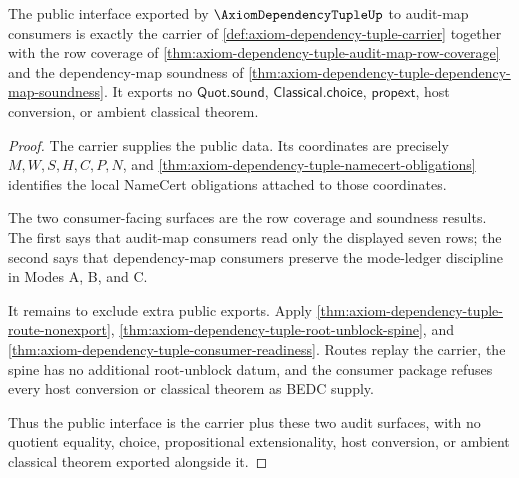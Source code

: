 \begin{theorem}
\label{thm:axiom-dependency-tuple-public-interface-exactness}
The public interface exported by $\AxiomDependencyTupleUp$ to audit-map
consumers is exactly the carrier of
\autoref{def:axiom-dependency-tuple-carrier} together with the row coverage of
\autoref{thm:axiom-dependency-tuple-audit-map-row-coverage} and the
dependency-map soundness of
\autoref{thm:axiom-dependency-tuple-dependency-map-soundness}. It exports no
$\mathsf{Quot.sound}$, $\mathsf{Classical.choice}$, $\mathsf{propext}$, host
conversion, or ambient classical theorem.
\end{theorem}
\begin{proof}
The carrier supplies the public data. Its coordinates are precisely
$M,W,S,H,C,P,N$, and \autoref{thm:axiom-dependency-tuple-namecert-obligations}
identifies the local NameCert obligations attached to those coordinates.

The two consumer-facing surfaces are the row coverage and soundness results.
The first says that audit-map consumers read only the displayed seven rows;
the second says that dependency-map consumers preserve the mode-ledger
discipline in Modes A, B, and C.

It remains to exclude extra public exports. Apply
\autoref{thm:axiom-dependency-tuple-route-nonexport},
\autoref{thm:axiom-dependency-tuple-root-unblock-spine}, and
\autoref{thm:axiom-dependency-tuple-consumer-readiness}. Routes replay the
carrier, the spine has no additional root-unblock datum, and the consumer
package refuses every host conversion or classical theorem as BEDC supply.

Thus the public interface is the carrier plus these two audit surfaces, with
no quotient equality, choice, propositional extensionality, host conversion,
or ambient classical theorem exported alongside it.
\end{proof}
